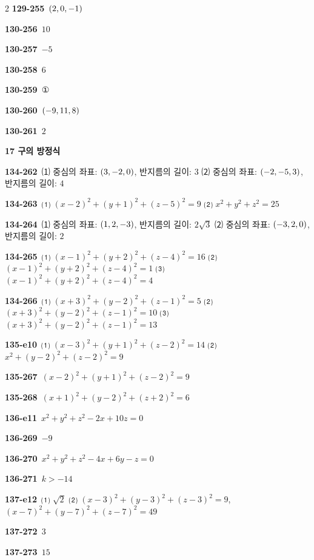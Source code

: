 \documentclass[10pt,a4paper]{article}
\begin{document}
\begin{multicols}{2}
\noindent\textbf{129-255}\ $(2{,}\mkern3mu\mathopen{}0{,}\mkern3mu\mathopen{}-1)$\par
\noindent\textbf{130-256}\ $10$\par
\noindent\textbf{130-257}\ $-5$\par
\noindent\textbf{130-258}\ $6$\par
\noindent\textbf{130-259}\ ①\par
\noindent\textbf{130-260}\ $(-9{,}\mkern3mu\mathopen{}11{,}\mkern3mu\mathopen{}8)$\par
\noindent\textbf{130-261}\ $2$\par
\noindent\textbf{17 구의 방정식}\par\smallskip
\noindent\textbf{134-262}\ ⑴ 중심의 좌표: $(3{,}\mkern3mu\mathopen{}-2{,}\mkern3mu\mathopen{}0)$, 반지름의 길이: $3$ ⑵ 중심의 좌표: $(-2{,}\mkern3mu\mathopen{}-5{,}\mkern3mu\mathopen{}3)$, 반지름의 길이: $4$\par
\noindent\textbf{134-263}\ ⑴ $(x-2)^2+(y+1)^2+(z-5)^2=9$ ⑵ $x^2+y^2+z^2=25$\par
\noindent\textbf{134-264}\ ⑴ 중심의 좌표: $(1{,}\mkern3mu\mathopen{}2{,}\mkern3mu\mathopen{}-3)$, 반지름의 길이: $2\sqrt{3}$ ⑵ 중심의 좌표: $(-3{,}\mkern3mu\mathopen{}2{,}\mkern3mu\mathopen{}0)$, 반지름의 길이: $2$\par
\noindent\textbf{134-265}\ ⑴ $(x-1)^2+(y+2)^2+(z-4)^2=16$ ⑵ $(x-1)^2+(y+2)^2+(z-4)^2=1$ ⑶ $(x-1)^2+(y+2)^2+(z-4)^2=4$\par
\noindent\textbf{134-266}\ ⑴ $(x+3)^2+(y-2)^2+(z-1)^2=5$ ⑵ $(x+3)^2+(y-2)^2+(z-1)^2=10$ ⑶ $(x+3)^2+(y-2)^2+(z-1)^2=13$\par
\noindent\textbf{135-e10}\ ⑴ $(x-3)^2+(y+1)^2+(z-2)^2=14$ ⑵ $x^2+(y-2)^2+(z-2)^2=9$\par
\noindent\textbf{135-267}\ $(x-2)^2+(y+1)^2+(z-2)^2=9$\par
\noindent\textbf{135-268}\ $(x+1)^2+(y-2)^2+(z+2)^2=6$\par
\noindent\textbf{136-e11}\ $x^2+y^2+z^2-2x+10z=0$\par
\noindent\textbf{136-269}\ $-9$\par
\noindent\textbf{136-270}\ $x^2+y^2+z^2-4x+6y-z=0$\par
\noindent\textbf{136-271}\ $k>-14$\par
\noindent\textbf{137-e12}\ ⑴ $\sqrt{2}$ ⑵ $(x-3)^2+(y-3)^2+(z-3)^2=9$, $(x-7)^2+(y-7)^2+(z-7)^2=49$\par
\noindent\textbf{137-272}\ $3$\par
\noindent\textbf{137-273}\ $15$\par

\end{multicols}
\end{document}
